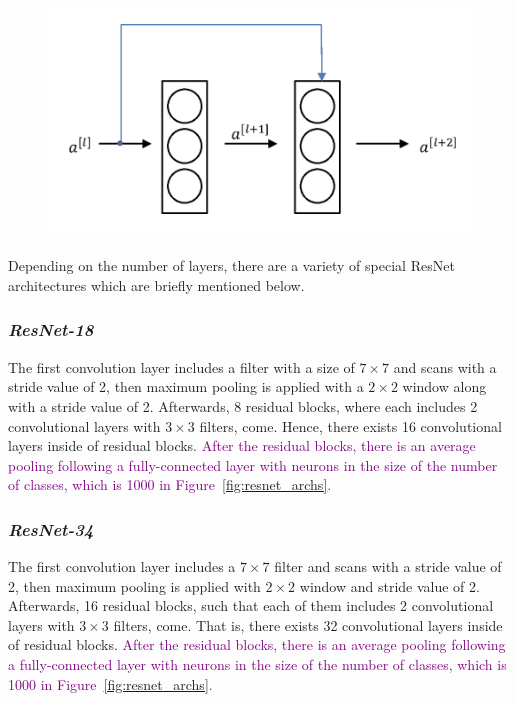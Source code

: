 \begin{figure}[h]
    \centering
    \includegraphics[width=.6\linewidth]{fig/residual_block.png}
    \label{fig:residual_block}
\end{figure}

Depending on the number of layers, there are a variety of special ResNet architectures which are briefly mentioned below.

\subsubsection*{\textit{ResNet-18}}

The first convolution layer includes a filter with a size of $7 \times 7$ and scans with a stride value of 2, then maximum pooling is applied with a $2 \times 2$ window along with a stride value of 2. Afterwards, 8 residual blocks, where each includes 2 convolutional layers with $3 \times 3$ filters, come. Hence, there exists 16 convolutional layers inside of residual blocks. \textcolor{purple}{After the residual blocks, there is an average pooling following a fully-connected layer with neurons in the size of the number of classes, which is 1000 in Figure~\ref{fig:resnet_archs}.}

\subsubsection*{\textit{ResNet-34}}

The first convolution layer includes a $7 \times  7$ filter and scans with a stride value of 2, then maximum pooling is applied with $2 \times  2$ window and stride value of 2. Afterwards, 16 residual blocks, such that each of them includes 2 convolutional layers with $3 \times 3$ filters, come. That is, there exists 32 convolutional layers inside of residual blocks. \textcolor{purple}{After the residual blocks, there is an average pooling following a fully-connected layer with neurons in the size of the number of classes, which is 1000 in Figure~\ref{fig:resnet_archs}.}

